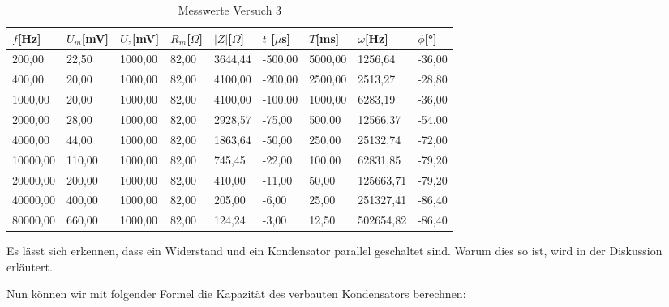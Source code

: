         \begin{table}[H]
            \centering
            \caption{Messwerte Versuch 3}
            \vspace{0.5em}
            \begin{tabular}{|l||l|l|l|l|l|l|l|l|}
                \hline
                $f$[Hz] & $U_m$[mV]  & $U_z$[mV] & $R_{m}$[$\Omega$] & $|Z|$[$\Omega$] & $t$ [$\mu$s] & $T$[ms] & $\omega$[Hz] & $\phi$[°] \\
                \hline
                \hline
                200,00   & 22,50  & 1000,00 & 82,00 & 3644,44 & -500,00 & 5000,00 & 1256,64   & -36,00 \\
                \hline
                400,00   & 20,00  & 1000,00 & 82,00 & 4100,00 & -200,00 & 2500,00 & 2513,27   & -28,80 \\
                \hline
                1000,00  & 20,00  & 1000,00 & 82,00 & 4100,00 & -100,00 & 1000,00 & 6283,19   & -36,00 \\
                \hline
                2000,00  & 28,00  & 1000,00 & 82,00 & 2928,57 & -75,00  & 500,00  & 12566,37  & -54,00 \\
                \hline
                4000,00  & 44,00  & 1000,00 & 82,00 & 1863,64 & -50,00  & 250,00  & 25132,74  & -72,00 \\
                \hline
                10000,00 & 110,00 & 1000,00 & 82,00 & 745,45  & -22,00  & 100,00  & 62831,85  & -79,20 \\
                \hline
                20000,00 & 200,00 & 1000,00 & 82,00 & 410,00  & -11,00  & 50,00   & 125663,71 & -79,20 \\
                \hline
                40000,00 & 400,00 & 1000,00 & 82,00 & 205,00  & -6,00   & 25,00   & 251327,41 & -86,40 \\
                \hline
                80000,00 & 660,00 & 1000,00 & 82,00 & 124,24  & -3,00   & 12,50   & 502654,82 & -86,40\\
                \hline
            \end{tabular}
            \label{tab:Versuch3_Messwerte}
        \end{table}

        \noindent Es lässt sich erkennen, dass ein Widerstand und ein Kondensator parallel geschaltet sind. Warum dies so ist, wird in der Diskussion erläutert.

        \noindent Nun können wir mit folgender Formel die Kapazität des verbauten Kondensators berechnen:
    
